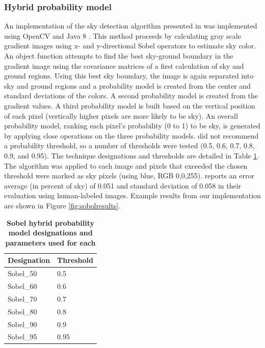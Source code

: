 \documentclass[final,3p,times,authoryear]{elsarticle}
\begin{document}
\subsubsection{Hybrid probability model}\label{sec:prob}
An implementation of the sky detection algorithm presented in \cite{Wang2015a} was implemented using OpenCV \citep{Bradski2000} and Java 8 \citep{Oracle2018}. This method proceeds by calculating gray scale gradient images using x- and y-directional Sobel operators to estimate sky color. An object function attempts to find the best sky-ground boundary in the gradient image using the covariance matrices of a first calculation of sky and ground regions. Using this best sky boundary, the image is again separated into sky and ground regions and a probability model is created from the center and standard deviations of the colors. A second probability model is created from the gradient values. A third probability model is built based on the vertical position of each pixel (vertically higher pixels are more likely to be sky). An overall probability model, ranking each pixel's probability (0 to 1) to be sky, is generated by applying close operations on the three probability models. \cite{Wang2015a} did not recommend a probability threshold, so a number of thresholds were tested (0.5, 0.6, 0.7, 0.8, 0.9, and 0.95). The technique designations and thresholds are detailed in Table \ref{tab:techniques4}. The algorithm was applied to each image and pixels that exceeded the chosen threshold were marked as sky pixels (using blue, RGB 0,0,255). \cite{Wang2015a} reports an error average (in percent of sky) of 0.051 and standard deviation of 0.058 in their evaluation using human-labeled images.  Example results from our implementation are shown in Figure \ref{fig:sobolresults}. 


\begin{table}[!htbp]
\caption{\bf Sobel hybrid probability model designations and parameters used for each  \label{tab:techniques4}}     
\begin{tabular}{ l  l }
\textbf{Designation}  & \textbf{Threshold}    \\ \hline
Sobel\_50 & 0.5 \\	  
Sobel\_60 & 0.6 \\	
Sobel\_70 & 0.7 \\	
Sobel\_80 & 0.8 \\
Sobel\_90 & 0.9 \\
Sobel\_95 & 0.95 \\
\hline
\end{tabular}
\end{table}
\end{document}
